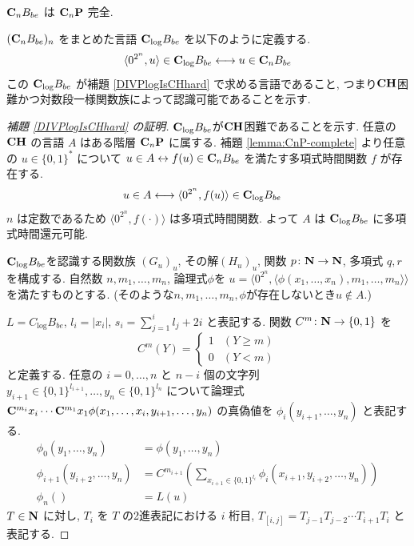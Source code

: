 \begin{lemma} \label{lemma:CnP-complete}
 $\mathbf{C}_n B_{be}$ は $\mathbf{C}_n\mathbf{P}$ 完全.
\end{lemma}


$(\mathbf{C}_n B_{be})_n$ をまとめた言語 $\mathbf{C}_{\log} B_{be}$ を以下のように定義する.
\begin{equation}
 \langle 0^{2^n}, u \rangle \in \mathbf{C}_{\log} B_{be}
 \longleftrightarrow
 u \in \mathbf{C}_n B_{be}
\end{equation}
この $\mathbf{C}_{\log} B_{be}$ が補題 \ref{DIVPlogIsCHhard} で求める言語であること,
つまり$\mathbf{CH}$困難かつ対数段一様関数族によって認識可能であることを示す.


\begin{proof}[\rm 補題 \ref{DIVPlogIsCHhard} の証明]
 $\mathbf{C}_{\log} B_{be}$が$\mathbf{CH}$困難であることを示す.
 任意の $\mathbf{CH}$ の言語 $A$ はある階層 $\mathbf{C}_n \mathbf{P}$ に属する. 
 補題 \ref{lemma:CnP-complete} より任意の $u \in \{0,1\}^*$ について
 $u \in A \leftrightarrow f(u) \in \mathbf{C}_n B_{be}$ 
 を満たす多項式時間関数 $f$ が存在する.
 \begin{align}
  u \in A 
  & \longleftrightarrow \langle 0^{2^n}, f(u) \rangle \in \mathbf{C}_{\log} B_{be}
 \end{align}
 $n$ は定数であるため $\langle 0^{2^n}, f(\cdot) \rangle$ は多項式時間関数.
 よって $A$ は $\mathbf{C}_{\log} B_{be}$ に多項式時間還元可能.


 $\mathbf{C}_{\log} B_{be}$を認識する関数族 $(G_u)_u$, 
 その解$(H_u)_u$, 関数 $p \colon \mathbf N \to \mathbf N$, 多項式 $q,r$ を構成する.
 自然数 $n, m_1, \dots, m_n$, 論理式$\phi$を
 $u  = \langle 0^{2^n}, 
 \langle \phi(x_1, \dots, x_n), m_1, \dots, m_n \rangle \rangle$
 を満たすものとする. 
 (そのような$n, m_1, \dots, m_n, \phi$が存在しないとき$u \not \in A$.)
 
 
 $L = C_{\log} B_{be}$,
 $l_i = |x_i|$,
 $s_i = \sum^i_{j=1}l_j + 2i$  と表記する.
 関数 $C^m \colon \mathbf N \to \{0,1\}$ を
 \begin{equation}
  C^m(Y) 
     = \begin{cases}
       1 & (Y \ge m) \\
       0 & (Y < m) \end{cases}
 \end{equation}
 と定義する. 
 任意の $i = 0, \dots, n$ と $n-i$ 個の文字列 
 $y_{i+1} \in \{0,1\}^{l_{i+1}}, \dots, y_n \in \{0,1\}^{l_n}$ 
 について論理式
 $\mathbf{C}^{m_{i}}{x_i} \cdots \mathbf{C}^{m_1}{x_1}
 \phi(x_1, \dots, x_i, y_{i+1}, \dots, y_n)$
 の真偽値を $\phi_i(y_{i+1}, \dots, y_n)$ と表記する.
 \begin{align}
  \phi_0 (y_1, \dots, y_n) &= \phi(y_1, \dots, y_n)
  \\ \label{eq:phi-step}
  \phi_{i+1}(y_{i+2}, \dots, y_n) 
  &= C^{m_{i+1}}\left(\sum\nolimits_{x_{i+1} \in \{0,1\}^{l_i}} 
  \phi_i(x_{i+1}, y_{i+2}, \dots, y_{n})\right) 
  \\
  \phi_n() &= L(u) 
 \end{align}
 $T \in \mathbf N$ に対し, $T_i$ を $T$ の2進表記における $i$ 桁目, 
 $T_{[i,j]} = T_{j-1} T_{j-2} \cdots T_{i+1} T_{i}$ と表記する.



\end{proof}
